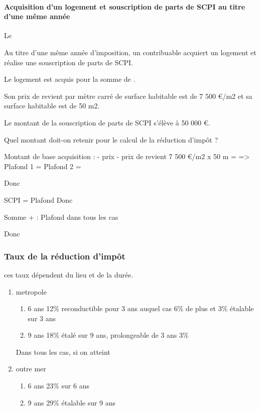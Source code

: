 				\paragraph{Acquisition d'un logement et souscription de parts de SCPI au titre d'une même année}

					Le
					\begin{casPratique}{%
						Au titre d'une même année d'imposition, un contribuable acquiert un logement et réalise une souscription de parts de SCPI.

						Le logement est acquis pour la somme de .

						Son prix de revient par mètre carré de surface habitable est de 7 500 €/m2 et sa surface habitable est de 50 m2.

						Le montant de la souscription de parts de SCPI s'élève à 50 000 €.

						Quel montant doit-on retenir pour le calcul de la réduction d’impôt ?
						}
						Montant de base acquisition :
						- prix 
						- prix de revient 7 500 €/m2 x 50 m = 
						=> 
						Plafond 1 = 
						Plafond 2 = 

						Donc 

						SCPI = 
						Plafond 
						Donc 

						Somme  +  : 
						Plafond dans tous les cas 

						Donc 
					\end{casPratique}


			\subsubsection{Taux de la réduction d'impôt}
				ces taux dépendent du lieu et de la durée.

				\begin{enumerate}
					\item metropole
					\begin{enumerate}
						\item 6 ans 12\% reconductible pour 3 ans auquel cas 6\% de plus et 3\% étalable sur 3 ans
						\item 9 ans 18\% étalé sur 9 ans, prolongeable de 3 ans 3\%
					\end{enumerate}
					Dans tous les cas, si on atteint
					\item outre mer
					\begin{enumerate}
						\item 6 ans 23\% sur 6 ans
						\item 9 ans 29\% étalable sur 9 ans
					\end{enumerate}
				\end{enumerate}

